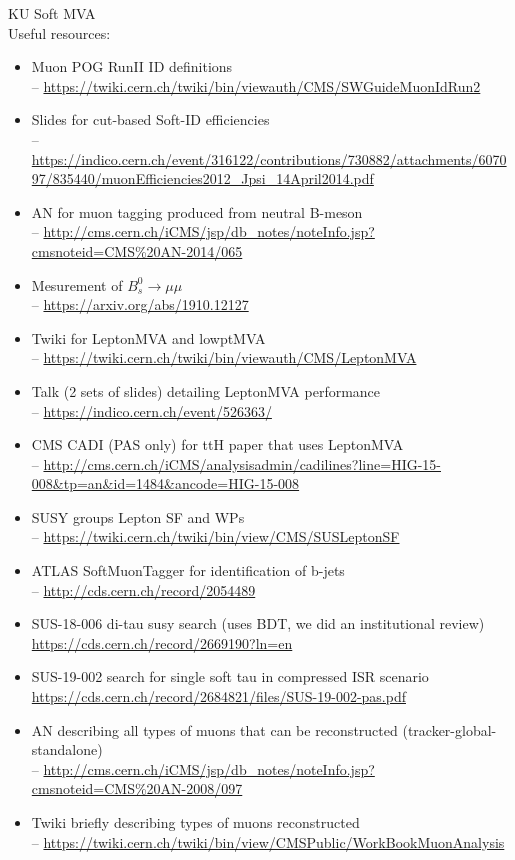 \documentclass[10pt,a4paper]{article}
\begin{document}
KU Soft MVA\\

Useful resources:\\

\begin{itemize}
\item Muon POG RunII ID definitions \\ 
-- \url{https://twiki.cern.ch/twiki/bin/viewauth/CMS/SWGuideMuonIdRun2}
\item Slides for cut-based Soft-ID efficiencies \\
-- \url{https://indico.cern.ch/event/316122/contributions/730882/attachments/607097/835440/muonEfficiencies2012_Jpsi_14April2014.pdf}
\item AN for muon tagging produced from neutral B-meson\\
-- \url{http://cms.cern.ch/iCMS/jsp/db_notes/noteInfo.jsp?cmsnoteid=CMS%20AN-2014/065}
\item Mesurement of $B_s^0 \rightarrow \mu \mu$ \\
-- \url{https://arxiv.org/abs/1910.12127 }
\item Twiki for LeptonMVA and lowptMVA \\ 
-- \url{https://twiki.cern.ch/twiki/bin/viewauth/CMS/LeptonMVA}
\item Talk (2 sets of slides) detailing LeptonMVA performance\\
-- \url{https://indico.cern.ch/event/526363/}
\item CMS CADI (PAS only) for ttH paper that uses LeptonMVA \\
-- \url{http://cms.cern.ch/iCMS/analysisadmin/cadilines?line=HIG-15-008&tp=an&id=1484&ancode=HIG-15-008}
\item SUSY groups Lepton SF and WPs \\
-- \url{https://twiki.cern.ch/twiki/bin/view/CMS/SUSLeptonSF}
\item ATLAS SoftMuonTagger for identification of b-jets\\
-- \url{http://cds.cern.ch/record/2054489}
\item SUS-18-006 di-tau susy search (uses BDT, we did an institutional review)\\
\url{https://cds.cern.ch/record/2669190?ln=en}

\item SUS-19-002 search for single soft tau in compressed ISR scenario\\
\url{https://cds.cern.ch/record/2684821/files/SUS-19-002-pas.pdf}
\item AN describing all types of muons that can be reconstructed (tracker-global-standalone)\\
-- \url{http://cms.cern.ch/iCMS/jsp/db_notes/noteInfo.jsp?cmsnoteid=CMS%20AN-2008/097}
\item Twiki briefly describing types of muons reconstructed\\
-- \url{https://twiki.cern.ch/twiki/bin/view/CMSPublic/WorkBookMuonAnalysis}

\end{itemize}
\end{document}
